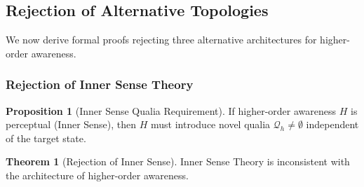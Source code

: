 \documentclass[11pt,a4paper]{article}
\theoremstyle{definition}
\newtheorem{proposition}{Proposition}[section]
\newtheorem{theorem}{Theorem}[section]
\theoremstyle{remark}
\newcommand{\Q}{\mathcal{Q}}
\begin{document}
\subsection{Rejection of Alternative Topologies}

We now derive formal proofs rejecting three alternative architectures for higher-order awareness.

\subsubsection{Rejection of Inner Sense Theory}

\begin{proposition}[Inner Sense Qualia Requirement]
\label{prop:inner-sense}
If higher-order awareness $H$ is perceptual (Inner Sense), then $H$ must introduce novel qualia $\Q_h \neq \emptyset$ independent of the target state.
\end{proposition}

\begin{theorem}[Rejection of Inner Sense]
\label{thm:reject-inner}
Inner Sense Theory is inconsistent with the architecture of higher-order awareness.
\end{theorem}
\end{document}
